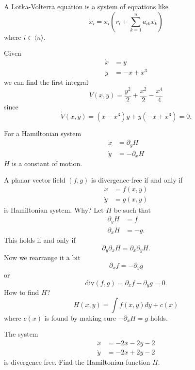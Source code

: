 \documentclass{article}
\newcommand*{\half}[1]{\frac{#1}{2}}
\newcommand*{\jbr}[1]{{\langle #1 \rangle}}
\newcommand*{\divg}{\text{div}}
\begin{document}
\begin{defin}
    A Lotka-Volterra equation is a system of equations like
    $$\dot x_i = x_i\left(r_i + \sum_{k=1}^na_{ik}x_k\right)$$
    where $i \in \jbr{n}$.
\end{defin}

\begin{exam}
    Given
    $$\begin{aligned}
        \dot x &= y\\
        \dot y &= -x+x^3
    \end{aligned}$$
    we can find the first integral
    $$V(x,y)=\half{y^2}+\half{x^2}-\frac{x^4}{4}$$
    since
    $$\dot V(x,y) = (x-x^3)y +y(-x+x^3)=0.$$
\end{exam}

\begin{rem}
    For a Hamiltonian system
    $$\begin{aligned}
        \dot x&=\partial_y H\\
        \dot y &= -\partial_x H
    \end{aligned}$$
    $H$ is a constant of motion.
\end{rem}

\begin{rem}
    A planar vector field $(f,g)$ is divergence-free if and only if
    $$\begin{aligned}
        \dot x &= f(x,y)\\
        \dot y &= g(x,y)
    \end{aligned}$$
    is Hamiltonian system. Why?
    Let $H$ be such that
    $$\begin{aligned}
        \partial_y H &= f\\
        \partial_x H &= -g.
    \end{aligned}$$
    This holds if and only if
    $$\partial_y\partial_xH = \partial_x\partial_yH.$$
    Now we rearrange it a bit
    $$\partial_xf = -\partial_yg$$
    or
    $$\divg(f,g) = \partial_xf+\partial_y g = 0.$$
    How to find $H$?
    $$H(x,y) = \int f(x,y)dy+c(x)$$
    where $c(x)$ is found by making sure $-\partial_xH=g$ holds.
\end{rem}

\begin{hw}
    The system
    $$\begin{aligned}
        \dot x &= -2x-2y-2\\
        \dot y &= -2x+2y-2
    \end{aligned}$$
    is divergence-free. Find the Hamiltonian function $H$.
\end{hw}
\end{document}
